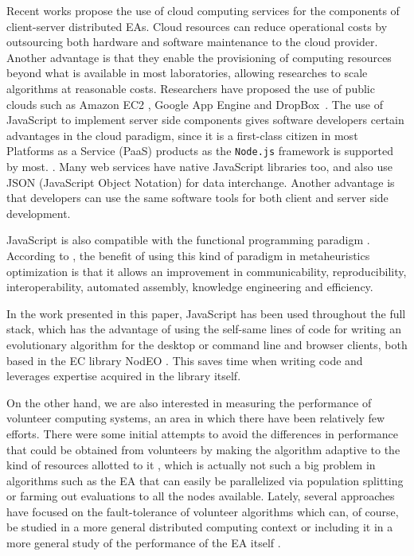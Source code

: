 \documentclass[journal,onecolumn]{IEEEtran}
\begin{document}
Recent works propose the use of cloud computing services for the components of
client-server distributed EAs. Cloud resources
can reduce operational costs by outsourcing both hardware and software maintenance
to the cloud provider. Another advantage is that they enable the provisioning of computing resources beyond what
is available in most laboratories, allowing researches to
scale algorithms at reasonable costs. Researchers have proposed the use of
public clouds such as Amazon EC2 \cite{CloudScale}, Google App Engine\cite{di2013towards}
and DropBox~\cite{mericloud}. The use of JavaScript to implement
server side components
gives software developers certain advantages in the cloud
paradigm, since it is a first-class citizen
in most Platforms as a Service (PaaS) products as the {\tt Node.js} framework is supported by most. \cite{wood13:nodejs:paas}. Many web services
have native JavaScript libraries too, and also use JSON (JavaScript Object Notation) for data interchange. Another advantage is that
developers can use the same software tools for both client and server
side development.

JavaScript is also compatible with the functional programming paradigm \cite{Cousineau1998,MacLennan1990,Thompson1996}.
According to \cite{swanresearch2015}, the benefit of using this kind of paradigm in
metaheuristics optimization is that it allows an improvement in communicability,
reproducibility, interoperability, automated assembly, knowledge engineering
and efficiency.

In the work presented in this paper, JavaScript has been used throughout the full
stack, which has the advantage of using the self-same lines of code for
writing an evolutionary algorithm for the
desktop or command line and browser clients, both based in the EC
library NodEO \cite{DBLP:conf/gecco/GuervosVGES14}. This saves time 
when writing code and leverages 
expertise acquired in the library itself. 

On the other hand, we are also interested in measuring the performance
of volunteer computing systems, an area in which there have been
relatively few efforts.
There were some initial attempts to avoid the differences in performance
that could be obtained from volunteers  by making
the algorithm adaptive to the kind of resources allotted to it
\cite{milani2004online}, which is actually not such a big problem in
algorithms such as the EA that can easily be
parallelized via population splitting or farming out evaluations to all
the nodes available. Lately, several approaches have focused on the
fault-tolerance of volunteer algorithms
\cite{gonzalez2010characterizing} which can, of course, be studied in
a more general distributed computing context
\cite{nogueras2015studying} or including it in a more general study of the
performance of the EA itself
\cite{DBLP:journals/gpem/LaredoBGVAGF14}.
\end{document}
